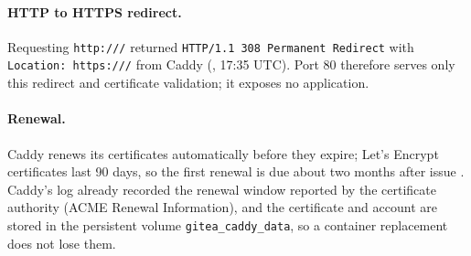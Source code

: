 \begin{longlisting}
\inputminted[fontsize=\scriptsize]{text}{../evidence/13-https-redirect-cert-and-port-probes-2026-10-15.txt}
\caption{HTTP redirect, HTTPS response, the served certificate, and port probes from the administrator's computer, October 15, 2026, 17:35 UTC (real output).}
\label{Listing:E13}
\end{longlisting}

\paragraph{HTTP to HTTPS redirect.}
Requesting \texttt{http://\GiteaHost/} returned \texttt{HTTP/1.1 308 Permanent
Redirect} with \texttt{Location: https://\GiteaHost/} from Caddy (,
17:35 UTC). Port 80 therefore serves only this redirect and certificate
validation; it exposes no application.

\paragraph{Renewal.}
Caddy renews its certificates automatically before they expire; Let's Encrypt
certificates last 90 days, so the first renewal is due about two months after
issue \cite{CaddyAutoHTTPS}. Caddy's log already recorded the renewal window
reported by the certificate authority (ACME Renewal Information), and the
certificate and account are stored in the persistent volume
\texttt{gitea\_caddy\_data}, so a container replacement does not lose them.
